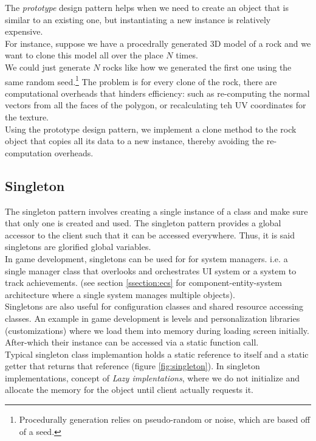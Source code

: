 \documentclass[10pt,letterpaper]{article}
\newcommand{\bs}{\bigskip}
\begin{document}
\begin{multicols}{2}
The \textit{prototype} design pattern helps when we need to create an object that is similar to an existing one, but instantiating a new instance is relatively expensive.\bs
\\
For instance, suppose we have a procedrally generated 3D model of a rock and we want to clone this model all over the place $N$ times.\bs
\\
We could just generate $N$ rocks like how we generated the first one using the same random seed.\footnote{Procedurally generation relies on pseudo-random or noise, which are based off of a seed.} The problem is for every clone of the rock, there are computational overheads that hinders efficiency: such as re-computing the normal vectors from all the faces of the polygon, or recalculating teh UV coordinates for the texture.\bs
\\
Using the prototype design pattern, we implement a clone method to the rock object that copies all its data to a new instance, thereby avoiding the re-computation overheads.

\subsection{Singleton}

The singleton pattern involves creating a single instance of a class and make sure that only one is created and used\cite{tp-singleton}. The singleton pattern provides a global accessor to the client such that it can be accessed everywhere. Thus, it is said singletons are glorified global variables.\cite{ood-singleton, sm-singleton}\bs
\\
In game development, singletons can be used for for system managers. i.e. a single manager class that overlooks and orchestrates UI system or a system to track achievements. (see section \ref{ssection:ecs} for component-entity-system architecture where a single system manages multiple objects).\bs
\\
Singletons are also useful for configuration classes and shared resource accessing classes.\cite{ood-singleton} An example in game development is levels and personalization libraries (customizations) where we load them into memory during loading screen initially. After-which their instance can be accessed via a static function call.\bs
\\
Typical singleton class implemantion holds a static reference to itself and a static getter that returns that reference (figure \ref{fig:singleton}). In singleton implementations, concept of \textit{Lazy implentations}, where we do not initialize and allocate the memory for the object until client actually requests it.


\end{multicols}
\end{document}
